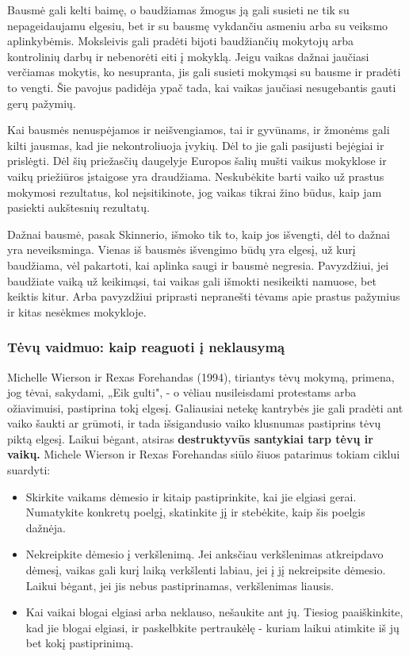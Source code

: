 \documentclass{article}
\begin{document}
Bausmė gali kelti baimę, o baudžiamas žmogus ją gali susieti ne tik su nepageidaujamu elgesiu, bet ir su bausmę vykdančiu asmeniu arba su veiksmo aplinkybėmis. Moksleivis gali pradėti bijoti baudžiančių mokytojų arba kontrolinių darbų ir nebenorėti eiti į mokyklą. Jeigu vaikas dažnai jaučiasi verčiamas mokytis, ko nesupranta, jis gali susieti mokymąsi su bausme ir pradėti to vengti. Šie pavojus padidėja ypač tada, kai vaikas jaučiasi nesugebantis gauti gerų pažymių. 

Kai bausmės nenuspėjamos ir neišvengiamos, tai ir gyvūnams, ir žmonėms gali kilti jausmas, kad jie nekontroliuoja įvykių. Dėl to jie gali pasijusti bejėgiai ir prislėgti. Dėl šių priežasčių daugelyje Europos šalių mušti vaikus mokyklose ir vaikų priežiūros įstaigose yra draudžiama. Neskubėkite barti vaiko už prastus mokymosi rezultatus, kol neįsitikinote, jog vaikas tikrai žino būdus, kaip jam pasiekti aukštesnių rezultatų.

Dažnai bausmė, pasak Skinnerio, išmoko tik to, kaip jos išvengti, dėl to dažnai yra neveiksminga. Vienas iš bausmės išvengimo būdų yra elgesį, už kurį baudžiama, vėl pakartoti, kai aplinka saugi ir bausmė negresia. Pavyzdžiui, jei baudžiate vaiką už keikimąsi, tai vaikas gali išmokti nesikeikti namuose, bet keiktis kitur. Arba pavyzdžiui priprasti nepranešti tėvams apie prastus pažymius ir kitas nesėkmes mokykloje.

\subsubsection{Tėvų vaidmuo: kaip reaguoti į neklausymą}

Michelle Wierson ir Rexas Forehandas (1994), tiriantys tėvų mokymą, primena,
jog tėvai, sakydami, „Eik gulti", - o vėliau nusileisdami protestams arba ožiavimuisi, pastiprina tokį elgesį. Galiausiai netekę kantrybės jie gali pradėti ant vaiko šaukti ar grūmoti, ir tada išsigandusio vaiko klusnumas pastiprins tėvų piktą elgesį. Laikui bėgant, atsiras \textbf{destruktyvūs santykiai tarp tėvų ir vaikų.} Michele Wierson ir Rexas Forehandas siūlo šiuos patarimus tokiam ciklui suardyti:
 \begin{itemize}
\item Skirkite vaikams dėmesio ir kitaip pastiprinkite, kai jie elgiasi gerai. Numatykite
konkretų poelgį, skatinkite jį ir stebėkite, kaip šis poelgis dažnėja.
\item Nekreipkite dėmesio į verkšlenimą. Jei anksčiau verkšlenimas atkreipdavo
dėmesį, vaikas gali kurį laiką verkšlenti labiau, jei į jį nekreipsite dėmesio. Laikui bėgant, jei jis nebus pastiprinamas, verkšlenimas liausis.
\item Kai vaikai blogai elgiasi arba neklauso, nešaukite ant jų. Tiesiog paaiškinkite, kad jie blogai elgiasi, ir paskelbkite pertraukėlę - kuriam laikui atimkite iš jų bet kokį pastiprinimą.
\end{itemize}
\end{document}
